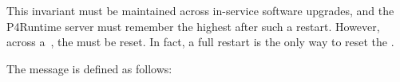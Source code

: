 \documentclass[11pt]{article}
\begin{document}
{%
This invariant must be maintained across in-service software upgrades, and the
P4Runtime server must remember the highest  after such a restart.
However, across a~, the  must be
reset. In fact, a full restart is the only way to reset the .%

The  message is defined as follows:%

}
\end{document}
